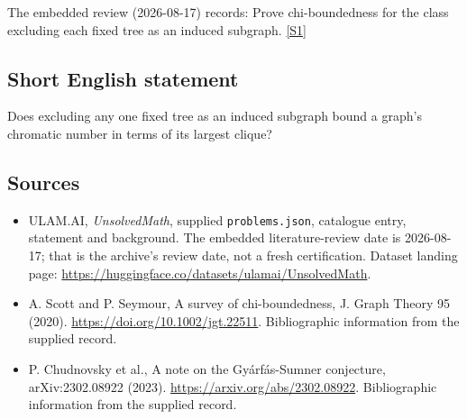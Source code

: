 \documentclass[11pt,a4paper]{article}
\newcommand{\sref}[2]{\hyperlink{source:#1:#2}{[S#2]}}
\begin{document}
The embedded review (2026-08-17) records: Prove chi-boundedness for the class excluding each fixed tree as an induced subgraph. \sref{statement}{1}

\subsection{Short English statement}

Does excluding any one fixed tree as an induced subgraph bound a graph’s chromatic number in terms of its largest clique?

\subsection{Sources}

{\small

\begin{itemize}

\item[\hypertarget{source:statement:1}{S1}] ULAM.AI, \emph{UnsolvedMath}, supplied \texttt{problems.json}, catalogue entry, statement and background. The embedded literature-review date is 2026-08-17; that is the archive’s review date, not a fresh certification. Dataset landing page: \url{https://huggingface.co/datasets/ulamai/UnsolvedMath}.

\item[\hypertarget{source:statement:2}{S2}] A. Scott and P. Seymour, A survey of chi-boundedness, J. Graph Theory 95 (2020). \url{https://doi.org/10.1002/jgt.22511}. Bibliographic information from the supplied record.

\item[\hypertarget{source:statement:3}{S3}] P. Chudnovsky et al., A note on the Gyárfás-Sumner conjecture, arXiv:2302.08922 (2023). \url{https://arxiv.org/abs/2302.08922}. Bibliographic information from the supplied record.

\end{itemize}

}

\label{end:statement}
\end{document}
